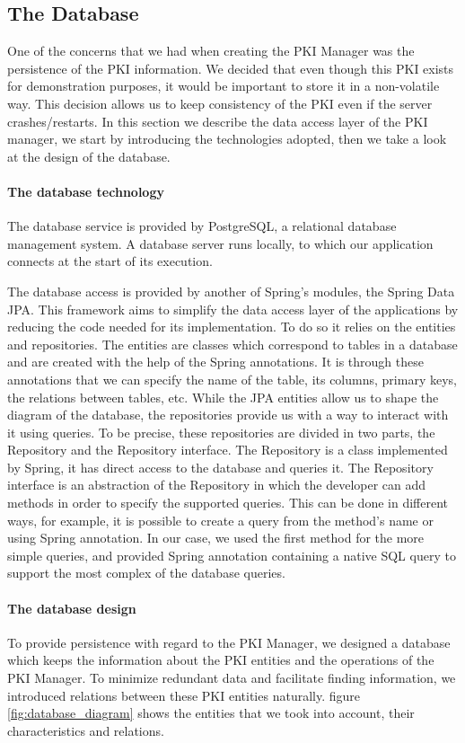 \subsection{The Database}
One of the concerns that we had when creating the PKI Manager was the persistence of the PKI information. We decided that even though this PKI exists for demonstration purposes, it would be important to store it in a non-volatile way. This decision allows us to keep consistency of the PKI even if the server crashes/restarts. In this section we describe the data access layer of the PKI manager, we start by introducing the technologies adopted, then we take a look at the design of the database. 

\paragraph{The database technology}
The database service is provided by PostgreSQL, a relational database management system. A database server runs locally, to which our application connects at the start of its execution.

The database access is provided by another of Spring's modules, the Spring Data JPA. This framework aims to simplify the data access layer of the applications by reducing the code needed for its implementation. To do so it relies on the entities and repositories. The entities are classes which correspond to tables in a database and are created with the help of the Spring annotations. It is through these annotations that we can specify the name of the table, its columns, primary keys, the relations between tables, etc. While the JPA entities allow us to shape the diagram of the database, the repositories provide us with a way to interact with it using queries. To be precise, these repositories are divided in two parts, the Repository and the Repository interface. The Repository is a class implemented by Spring, it has direct access to the database and queries it. The Repository interface is an abstraction of the Repository in which the developer can add methods in order to specify the supported queries. This can be done in different ways, for example, it is possible to create a query from the method's name or using Spring annotation. In our case, we used the first method for the more simple queries, and provided Spring annotation containing a native SQL query to support the most complex of the database queries. 

\paragraph{The database design}
To provide persistence with regard to the PKI Manager, we designed a database which keeps the information about the PKI entities and the operations of the PKI Manager. To minimize redundant data and facilitate finding information, we introduced relations between these PKI entities naturally. figure \ref{fig:database_diagram} shows the entities that we took into account, their characteristics and relations.


